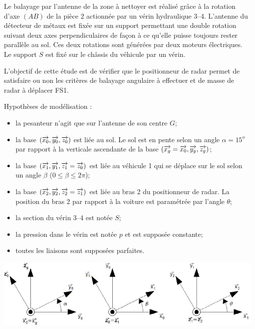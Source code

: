 \documentclass[10pt,oneside]{article}
\begin{document}
Le balayage par l'antenne de la zone à nettoyer est réalisé grâce à la rotation d'axe $(AB)$ de la pièce 2 actionnée par un vérin hydraulique 3--4. L'antenne du détecteur de métaux est fixée sur un support permettant une double rotation suivant deux axes perpendiculaires de façon à ce qu'elle puisse toujours rester parallèle au sol. Ces deux rotations sont générées par deux moteurs électriques. Le support $S$ est fixé sur le châssis du véhicule par un vérin.

L'objectif de cette étude est de vérifier que le positionneur de radar permet de satisfaire ou non les critères de balayage angulaire à effectuer et de masse de radar à déplacer FS1. 

Hypothèses de modélisation : 
\begin{itemize}
\item la pesanteur n'agit que sur l'antenne de son centre $G$; 
\item la base $(\overrightarrow{x_0}, \overrightarrow{y_0}, \overrightarrow{z_0})$ est liée au sol. Le sol est en pente selon un angle $\alpha=15^o$ par rapport à la verticale ascendante de la base $(\overrightarrow{x_g}= \overrightarrow{x_0}, \overrightarrow{y_g},\overrightarrow{z_g})$;
\item la base $(\overrightarrow{x_1}, \overrightarrow{y_1}, \overrightarrow{z_1}=\overrightarrow{z_0})$ est liée au véhicule 1 qui se déplace sur le sol selon un angle $\beta$ ($0\leq \beta \leq 2\pi$);
\item la base $(\overrightarrow{x_2}, \overrightarrow{y_2}, \overrightarrow{z_2}=\overrightarrow{z_1})$  est liée au bras 2 du positionneur de radar. La position du bras 2 par rapport à la voiture est paramétrée par l'angle $\theta$;
\item la section du vérin 3--4 est notée $S$; 
\item la pression dans le vérin est notée $p$ et est supposée constante;
\item toutes les liaisons sont supposées parfaites.
\end{itemize}


\begin{center}
\includegraphics[width=.9\textwidth]{png/img3}
\end{center}

\end{document}
